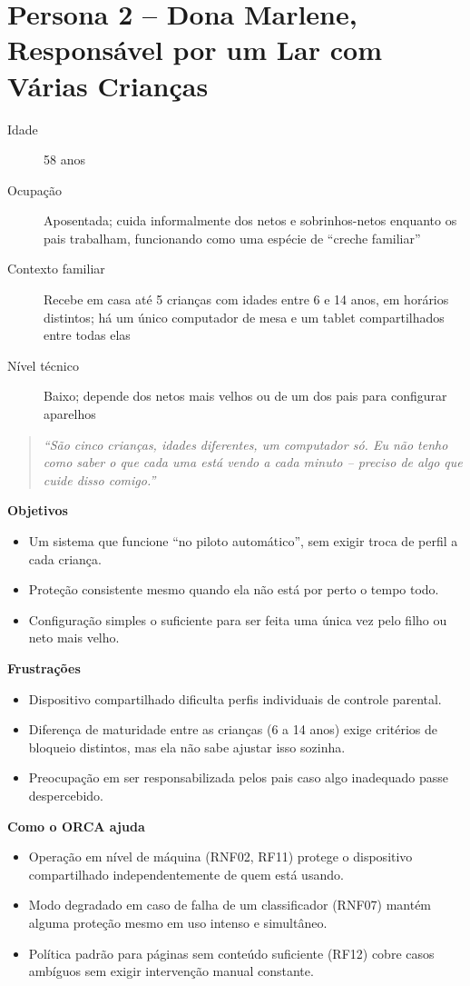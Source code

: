 \documentclass[
    12pt,           %
    oneside,        %
    a4paper,        %
    chapter=TITLE,  %
    english,        %
    brazil          %
]{abntex2}
\begin{document}
\section{Persona 2 -- Dona Marlene, Responsável por um Lar com Várias Crianças}

\begin{description}
  \item[Idade] 58 anos
  \item[Ocupação] Aposentada; cuida informalmente dos netos e sobrinhos-netos enquanto os pais trabalham, funcionando como uma espécie de ``creche familiar''
  \item[Contexto familiar] Recebe em casa até 5 crianças com idades entre 6 e 14 anos, em horários distintos; há um único computador de mesa e um tablet compartilhados entre todas elas
  \item[Nível técnico] Baixo; depende dos netos mais velhos ou de um dos pais para configurar aparelhos
\end{description}

\begin{quote}
\textit{``São cinco crianças, idades diferentes, um computador só. Eu não
tenho como saber o que cada uma está vendo a cada minuto -- preciso de algo
que cuide disso comigo.''}
\end{quote}

\textbf{Objetivos}
\begin{itemize}
  \item Um sistema que funcione ``no piloto automático'', sem exigir troca de perfil a cada criança.
  \item Proteção consistente mesmo quando ela não está por perto o tempo todo.
  \item Configuração simples o suficiente para ser feita uma única vez pelo filho ou neto mais velho.
\end{itemize}

\textbf{Frustrações}
\begin{itemize}
  \item Dispositivo compartilhado dificulta perfis individuais de controle parental.
  \item Diferença de maturidade entre as crianças (6 a 14 anos) exige critérios de bloqueio distintos, mas ela não sabe ajustar isso sozinha.
  \item Preocupação em ser responsabilizada pelos pais caso algo inadequado passe despercebido.
\end{itemize}

\textbf{Como o ORCA ajuda}
\begin{itemize}
  \item Operação em nível de máquina (RNF02, RF11) protege o dispositivo compartilhado independentemente de quem está usando.
  \item Modo degradado em caso de falha de um classificador (RNF07) mantém alguma proteção mesmo em uso intenso e simultâneo.
  \item Política padrão para páginas sem conteúdo suficiente (RF12) cobre casos ambíguos sem exigir intervenção manual constante.
\end{itemize}
\end{document}
